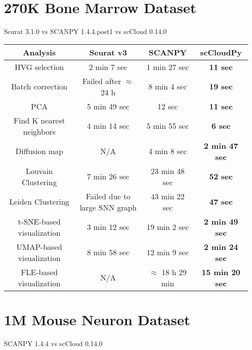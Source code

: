 \documentclass[10pt]{article}
\begin{document}
\section{270K Bone Marrow Dataset}

\paragraph{}
Seurat 3.1.0 \qquad vs \qquad SCANPY 1.4.4.post1 \qquad vs \qquad scCloud 0.14.0

\begin{table}[H]
	\centering
	\begin{tabular}{|c|c|c|c|}
		\hline
		Analysis & Seurat v3 & SCANPY & scCloudPy\\
		\hline \hline
		HVG selection & 2 min 7 sec & 1 min 27 sec & \textbf{11 sec} \\
		\hline
		Batch correction & Failed after $\approx$ 24 h & 8 min 4 sec & \textbf{19 sec} \\
		\hline
		PCA & 5 min 49 sec & 12 sec & \textbf{11 sec} \\
		\hline
		Find K nearest neighbors &  4 min 14 sec &  5 min 55 sec & \textbf{6 sec}\\
		\hline
		Diffusion map & N/A & 4 min 8 sec & \textbf{2 min 47 sec} \\
		\hline
		Louvain Clustering & 7 min 26 sec & 23 min 48 sec & \textbf{52 sec} \\
		\hline 
		Leiden Clustering & Failed due to large SNN graph & 43 min 22 sec & \textbf{47 sec}\\
		\hline
		t-SNE-based visualization & 3 min 12 sec & 19 min 2 sec & \textbf{2 min 49 sec}\\
		\hline
		UMAP-based visualization & 8 min 58 sec & 12 min 9 sec  & \textbf{2 min 24 sec}\\
		\hline
		FLE-based visualization & N/A & $\approx$ 18 h 29 min & \textbf{15 min 20 sec}\\
		\hline
	\end{tabular}
\end{table}

\section{1M Mouse Neuron Dataset}

\paragraph{}
SCANPY 1.4.4 \qquad vs \qquad scCloud 0.14.0
\end{document}
